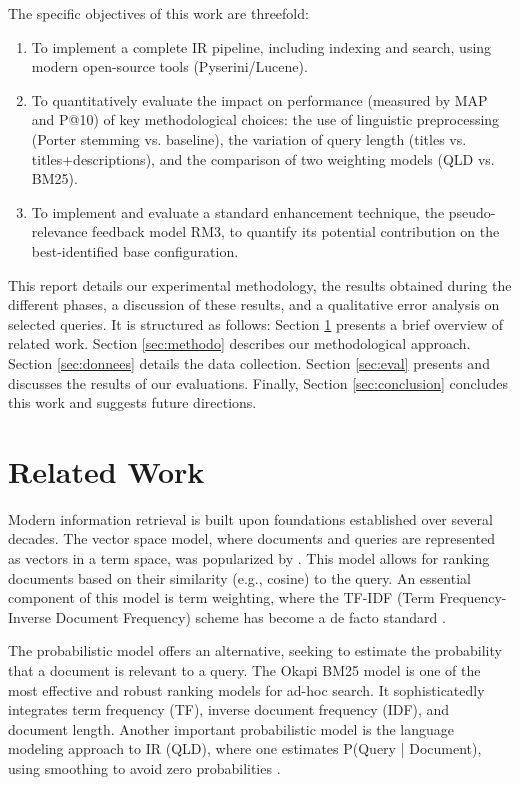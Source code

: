 \documentclass[11pt,a4paper]{article}
\begin{document}
The specific objectives of this work are threefold:
\begin{enumerate}
    \item To implement a complete IR pipeline, including indexing and search, using modern open-source tools (Pyserini/Lucene).
    \item To quantitatively evaluate the impact on performance (measured by MAP and P@10) of key methodological choices: the use of linguistic preprocessing (Porter stemming vs. baseline), the variation of query length (titles vs. titles+descriptions), and the comparison of two weighting models (QLD vs. BM25).
    \item To implement and evaluate a standard enhancement technique, the pseudo-relevance feedback model RM3, to quantify its potential contribution on the best-identified base configuration.
\end{enumerate}
This report details our experimental methodology, the results obtained during the different phases, a discussion of these results, and a qualitative error analysis on selected queries. It is structured as follows: Section \ref{sec:etat_art} presents a brief overview of related work. Section \ref{sec:methodo} describes our methodological approach. Section \ref{sec:donnees} details the data collection. Section \ref{sec:eval} presents and discusses the results of our evaluations. Finally, Section \ref{sec:conclusion} concludes this work and suggests future directions.
\clearpage
\section{Related Work}
\label{sec:etat_art}
Modern information retrieval is built upon foundations established over several decades. The vector space model, where documents and queries are represented as vectors in a term space, was popularized by \citet{Salton1988TermWeighting}. This model allows for ranking documents based on their similarity (e.g., cosine) to the query. An essential component of this model is term weighting, where the TF-IDF (Term Frequency-Inverse Document Frequency) scheme has become a de facto standard \citep{Salton1988TermWeighting}.

The probabilistic model offers an alternative, seeking to estimate the probability that a document is relevant to a query. The Okapi BM25 model \citep{Robertson1995Okapi} is one of the most effective and robust ranking models for ad-hoc search. It sophisticatedly integrates term frequency (TF), inverse document frequency (IDF), and document length. Another important probabilistic model is the language modeling approach to IR (QLD), where one estimates P(Query | Document), using smoothing to avoid zero probabilities \citep{Christopher2008Introduction}. %
\end{document}
